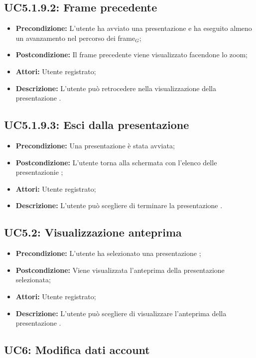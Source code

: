 \subsection{ UC5.1.9.2: Frame precedente}

\begin{itemize}
	\item \textbf{Precondizione:} L'utente ha avviato una presentazione e ha eseguito almeno un avanzamento nel percorso dei frame$_G$;
	\item \textbf{Postcondizione:} Il frame precedente viene visualizzato facendone lo zoom;
	\item \textbf{Attori:} Utente registrato;
	\item \textbf{Descrizione:} L'utente può retrocedere nella visualizzazione della presentazione .
\end{itemize}
\subsection{ UC5.1.9.3: Esci dalla presentazione }

\begin{itemize}
	\item \textbf{Precondizione:} Una presentazione è stata avviata;
	\item \textbf{Postcondizione:} L'utente torna alla schermata con l'elenco delle presentazionie ;
	\item \textbf{Attori:} Utente registrato;
	\item \textbf{Descrizione:} L'utente può scegliere di terminare la presentazione .
\end{itemize}
\subsection{ UC5.2: Visualizzazione anteprima }

\begin{itemize}
	\item \textbf{Precondizione:} L'utente ha selezionato una presentazione ;
	\item \textbf{Postcondizione:} Viene visualizzata l'anteprima della presentazione selezionata;
	\item \textbf{Attori:} Utente registrato;
	\item \textbf{Descrizione:} L'utente può scegliere di visualizzare l'anteprima della presentazione .
\end{itemize}

\newpage
\subsection{ UC6: Modifica dati account}

